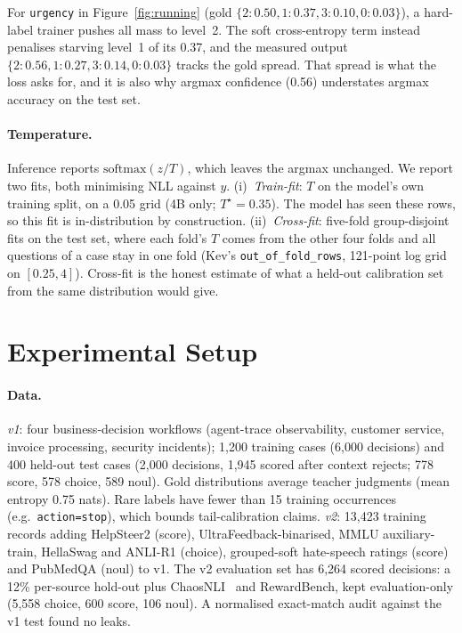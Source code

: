 \documentclass{article}
\begin{document}
For \texttt{urgency} in Figure~\ref{fig:running} (gold
$\{2{:}0.50, 1{:}0.37, 3{:}0.10, 0{:}0.03\}$), a hard-label trainer pushes
all mass to level~2. The soft cross-entropy term instead penalises starving
level~1 of its 0.37, and the measured output $\{2{:}0.56, 1{:}0.27,
3{:}0.14, 0{:}0.03\}$ tracks the gold spread. That spread is what the loss
asks for, and it is also why argmax confidence (0.56) understates argmax
accuracy on the test set.

\paragraph{Temperature.} Inference reports $\mathrm{softmax}(z/T)$, which
leaves the argmax unchanged. We report two fits, both minimising NLL against
$y$. (i)~\emph{Train-fit}: $T$ on the model's own training split, on a 0.05
grid (4B only; $T^\star=0.35$). The model has seen these rows, so this fit
is in-distribution by construction. (ii)~\emph{Cross-fit}: five-fold
group-disjoint fits on the test set, where each fold's $T$ comes from the
other four folds and all questions of a case stay in one fold (Kev's
\texttt{out\_of\_fold\_rows}, 121-point log grid on $[0.25, 4]$). Cross-fit
is the honest estimate of what a held-out calibration set from the same
distribution would give.

\section{Experimental Setup}

\paragraph{Data.} \emph{v1}: four business-decision workflows (agent-trace
observability, customer service, invoice processing, security incidents);
1,200 training cases (6,000 decisions) and 400 held-out test cases (2,000
decisions, 1,945 scored after context rejects; 778 score, 578 choice, 589
noul). Gold distributions average teacher judgments (mean entropy
0.75 nats). Rare labels have fewer than 15 training occurrences
(e.g.\ \texttt{action=stop}), which bounds tail-calibration claims.
\emph{v2}: 13,423 training records adding HelpSteer2 (score),
UltraFeedback-binarised, MMLU auxiliary-train, HellaSwag and ANLI-R1
(choice), grouped-soft hate-speech ratings (score) and PubMedQA (noul) to
v1. The v2 evaluation set has 6,264 scored decisions: a 12\% per-source
hold-out plus ChaosNLI~\cite{nie2020chaosnli} and RewardBench, kept
evaluation-only (5,558 choice, 600 score, 106 noul). A normalised
exact-match audit against the v1 test found no leaks.
\end{document}
